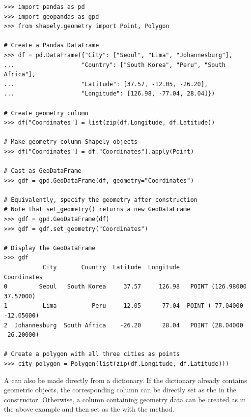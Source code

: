 \begin{lstlisting}
>>> import pandas as pd
>>> import geopandas as gpd
>>> from shapely.geometry import Point, Polygon

# Create a Pandas DataFrame
>>> df = pd.DataFrame({"City": ["Seoul", "Lima", "Johannesburg"],
...                   "Country": ["South Korea", "Peru", "South Africa"],
...                   "Latitude": [37.57, -12.05, -26.20],
...                   "Longitude": [126.98, -77.04, 28.04]})

# Create geometry column
>>> df["Coordinates"] = list(zip(df.Longitude, df.Latitude))

# Make geometry column Shapely objects
>>> df["Coordinates"] = df["Coordinates"].apply(Point)

# Cast as GeoDataFrame
>>> gdf = gpd.GeoDataFrame(df, geometry="Coordinates")

# Equivalently, specify the geometry after construction
# Note that set_geometry() returns a new GeoDataFrame
>>> gdf = gpd.GeoDataFrame(df)
>>> gdf = gdf.set_geometry("Coordinates")

# Display the GeoDataFrame
>>> gdf
           City       Country  Latitude  Longitude                  Coordinates
0         Seoul   South Korea     37.57     126.98   POINT (126.98000 37.57000)
1          Lima          Peru    -12.05     -77.04  POINT (-77.04000 -12.05000)
2  Johannesburg  South Africa    -26.20      28.04   POINT (28.04000 -26.20000)

# Create a polygon with all three cities as points
>>> city_polygon = Polygon(list(zip(df.Longitude, df.Latitude)))
\end{lstlisting}

A  can also be made directly from a dictionary.
If the dictionary already contains geometric objects, the corresponding column can be directly set as the  in the constructor.
Otherwise, a column containing geometry data can be created as in the above example and then set as the  with the  method.

